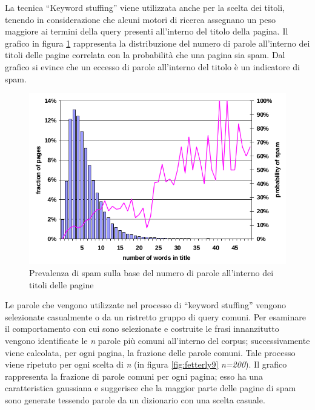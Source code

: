 La tecnica ``Keyword stuffing'' viene utilizzata anche per la scelta dei titoli, tenendo in considerazione che alcuni motori di ricerca assegnano un peso maggiore ai termini della query presenti all'interno del titolo della pagina. Il grafico in figura \ref{fig:fetterly4} rappresenta la distribuzione del numero di parole all'interno dei titoli delle pagine correlata con la probabilità che una pagina sia spam. Dal grafico si evince che un eccesso di parole all'interno del titolo è un indicatore di spam.
\begin{figure}[htbp]
\centering
\includegraphics[width=12cm]{immagini/fetterly/fetterly4}
\caption{Prevalenza di spam sulla base del numero di parole all'interno dei titoli delle pagine}
\label{fig:fetterly4}
\end{figure}
Le parole che vengono utilizzate nel processo di ``keyword stuffing'' vengono selezionate casualmente o da un ristretto gruppo di query comuni. Per esaminare il comportamento con cui sono selezionate e costruite le frasi innanzitutto vengono identificate le \textit{n} parole più comuni all'interno del corpus; successivamente viene calcolata, per ogni pagina, la frazione delle parole comuni. Tale processo viene ripetuto per ogni scelta di \textit{n} (in figura \ref{fig:fetterly9} \textit{n=200}). Il grafico rappresenta la frazione di parole comuni per ogni pagina; esso ha una caratteristica gaussiana e suggerisce che la maggior parte delle pagine di spam sono generate tessendo parole da un dizionario con una scelta casuale.
